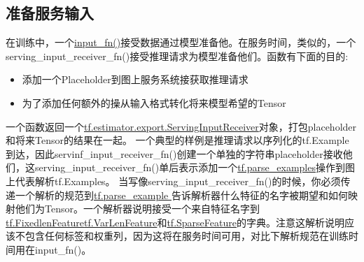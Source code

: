 \subsection{准备服务输入}
在训练中，一个\href{https://www.tensorflow.org/get_started/input_fn?hl=zh-cn}{input\_fn()}接受数据通过模型准备他。在服务时间，类似的，一个serving\_input\_receiver\_fn()接受推理请求为模型准备他们。函数有下面的目的:
\begin{itemize}
\item 添加一个Placeholder到图上服务系统接获取推理请求
\item 为了添加任何额外的操从输入格式转化将来模型希望的Tensor 
\end{itemize}
一个函数返回一个\href{https://www.tensorflow.org/api_docs/python/tf/estimator/export/ServingInputReceiver?hl=zh-cn}{tf.estimator.export.ServingInputReceiver}对象，打包placeholder和将来Tensor的结果在一起。
一个典型的样例是推理请求以序列化的tf.Example到达，因此servinf\_input\_receiver\_fn()创建一个单独的字符串placeholder接收他们，这serving\_input\_receiver\_fn()单后表示添加一个\href{https://www.tensorflow.org/api_docs/python/tf/parse_example?hl=zh-cn}{tf.parse\_examples}操作到图上代表解析tf.Examples。
当写像serving\_input\_receiver\_fn()的时候，你必须传递一个解析的规范到\href{https://www.tensorflow.org/api_docs/python/tf/parse_example?hl=zh-cn}{tf.parse_example }告诉解析器什么特征的名字被期望和如何映射他们为Tensor。一个解析器说明接受一个来自特征名字到\href{https://www.tensorflow.org/api_docs/python/tf/FixedLenFeature?hl=zh-cn}{tf.FixedlenFeature}\href{https://www.tensorflow.org/api_docs/python/tf/VarLenFeature?hl=zh-cn}{tf.VarLenFeature}和\href{https://www.tensorflow.org/api_docs/python/tf/SparseFeature?hl=zh-cn}{tf.SparseFeature}的字典。注意这解析说明应该不包含任何标签和权重列，因为这将在服务时间可用，对比下解析规范在训练时间用在input\_fn()。

